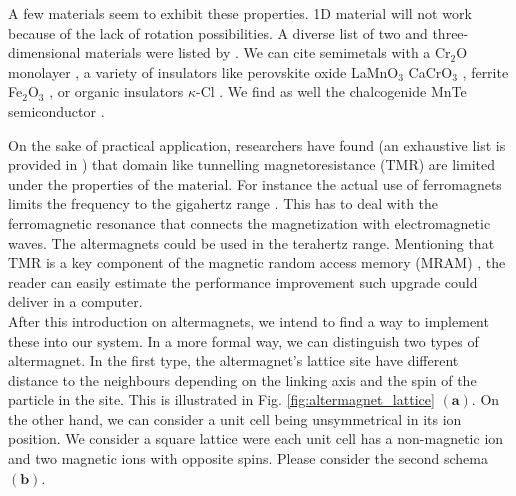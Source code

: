 \documentclass[../main.tex]{main.tex}
\begin{document}

A few materials seem to exhibit these properties. 1D material will not work because of the lack of rotation possibilities. A diverse list of two and three-dimensional 
materials were listed by \cite{Smejkal2022}. We can cite semimetals with a Cr$_2$O monolayer \cite{Chen_2023}, a variety of insulators like 
perovskite oxide LaMnO$_3$ \cite{Yuan2021} CaCrO$_3$ \cite{Naka2021}, ferrite  Fe$_2$O$_3$ \cite{Smejkal2022_2}, or organic insulators $\kappa$-Cl \cite{Naka2019}.
We find as well the chalcogenide MnTe semiconductor \cite{Smejkal2022_2}.

On the sake of practical application, researchers have found (an exhaustive list is provided in \cite{Mazin2024}) that
domain like tunnelling magnetoresistance (TMR) are limited under the properties of the material. For instance the actual use 
of ferromagnets limits the frequency to the gigahertz range \cite{Mazin2024}.
This has to deal with the ferromagnetic resonance that connects 
the magnetization with electromagnetic waves. The altermagnets could be used in the terahertz range.
Mentioning that TMR is a key component of the magnetic random access memory (MRAM) \cite{OSullivan2004}\cite{Yadav2022}, the reader can easily estimate the performance
improvement such upgrade could deliver in a computer.\\
 
After this introduction on altermagnets, we intend to find a way to implement these into our system. In a more formal way, we can
distinguish two types of altermagnet.
In the first type, the altermagnet's lattice site have different distance to the neighbours depending on the linking axis and the 
spin of the particle in the site. This is illustrated in Fig. \ref{fig:altermagnet_lattice} $(\bm{a})$. On the other hand, we can consider a unit cell being unsymmetrical
in its ion position. We consider a square lattice were each unit cell has a non-magnetic ion and two magnetic ions with opposite spins.
Please consider the second schema $(\bm{b})$.\\
\end{document}
